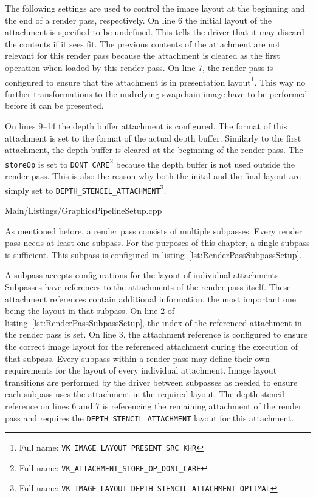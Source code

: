         The following settings are used to control the image layout at the beginning and the end of a render pass, respectively.
        On line 6 the initial layout of the attachment is specified to be undefined.
        This tells the \gls{driver} that it may discard the contents if it sees fit.
        The previous contents of the attachment are not relevant for this render pass because the attachment is cleared as the first operation when loaded by this render pass.
        On line 7, the render pass is configured to ensure that the attachment is in presentation layout\footnote{Full name: \lstinline{VK_IMAGE_LAYOUT_PRESENT_SRC_KHR}}.
        This way no further transformations to the undrelying swapchain image have to be performed before it can be presented.

        On lines 9--14 the depth buffer attachment is configured.
        The format of this attachment is set to the format of the actual depth buffer.
        Similarly to the first attachment, the depth buffer is cleared at the beginning of the render pass.
        The \lstinline{storeOp} is set to \lstinline{DONT_CARE}\footnote{Full name: \lstinline{VK_ATTACHMENT_STORE_OP_DONT_CARE}} because the depth buffer is not used outside the render pass.
        This is also the reason why both the inital and the final layout are simply set to \lstinline{DEPTH_STENCIL_ATTACHMENT}\footnote{Full name: \lstinline{VK_IMAGE_LAYOUT_DEPTH_STENCIL_ATTACHMENT_OPTIMAL}}.

        
        {Main/Listings/GraphicsPipelineSetup.cpp}

        As mentioned before, a render pass consists of multiple subpasses.
        Every render pass needs at least one subpass.
        For the purposes of this chapter, a single subpass is sufficient.
        This subpass is configured in listing~\ref{lst:RenderPassSubpassSetup}.

        A subpass accepts configurations for the layout of individual attachments.
        Subpasses have references to the attachments of the render pass itself.
        These attachment references contain additional information, the most important one being the layout in that subpass.
        On line 2 of listing~\ref{lst:RenderPassSubpassSetup}, the index of the referenced attachment in the render pass is set.
        On line 3, the attachment reference is configured to ensure the correct image layout for the referenced attachment during the execution of that subpass.
        Every subpass within a render pass may define their own requirements for the layout of every individual attachment.
        Image layout transitions are performed by the \gls{driver} between subpasses as needed to ensure each subpass uses the attachment in the required layout.
        The depth-stencil reference on lines 6 and 7 is referencing the remaining attachment of the render pass and requires the \lstinline{DEPTH_STENCIL_ATTACHMENT} layout for this attachment.

